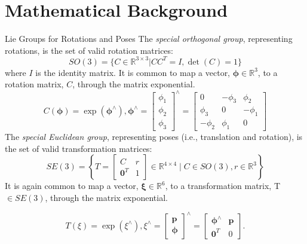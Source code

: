 \documentclass[8pt]{beamer}
\begin{document}
\section{Mathematical Background}
\begin{frame}{Lie Groups for Rotations and Poses}
The \textit{special orthogonal group}, representing rotations, is the set of valid rotation matrices:
\begin{equation}
SO(3) = \{ C \in \mathbb{R}^{3 \times 3} | CC^T = I, \det(C) = 1 \}
\end{equation}
where \( I \) is the identity matrix. It is common to map a vector, \( \boldsymbol{\phi} \in \mathbb{R}^3 \), to a rotation matrix, \( C \), through the matrix exponential.
\begin{equation}
    C(\boldsymbol{\phi}) = \exp (\boldsymbol{\phi}^\wedge),
    \boldsymbol{\phi}^\wedge = 
\begin{bmatrix}
\phi_1 \\
\phi_2 \\
\phi_3 
\end{bmatrix}
^\wedge = 
\begin{bmatrix}
0 & -\phi_3 & \phi_2 \\
\phi_3 & 0 & -\phi_1 \\
-\phi_2 & \phi_1 & 0 
\end{bmatrix}
\end{equation}
The \textit{special Euclidean group}, representing poses (i.e., translation and rotation), is the set of valid transformation matrices:
\begin{equation}
SE(3) = \left\{ T = \begin{bmatrix} C & r \\ \mathbf{0}^T & 1 \end{bmatrix} \in \mathbb{R}^{4 \times 4} \mid C \in SO(3), r \in \mathbb{R}^3 \right\}    
\end{equation}
It is again common to map a vector, \( \boldsymbol{\xi} \in \mathbb{R}^6 \), to a transformation matrix, T \( \in SE(3) \), through the matrix exponential.

\begin{equation}
T(\xi) = \exp(\xi^{\wedge}),
\xi^{\wedge} = \begin{bmatrix} \mathbf{p} \\ \boldsymbol{\phi} \end{bmatrix}^{\wedge} = \begin{bmatrix} \boldsymbol{\phi}^{\wedge} & \mathbf{p} \\ \mathbf{0}^T & 0 \end{bmatrix}.
\end{equation}

\end{frame}
\end{document}
